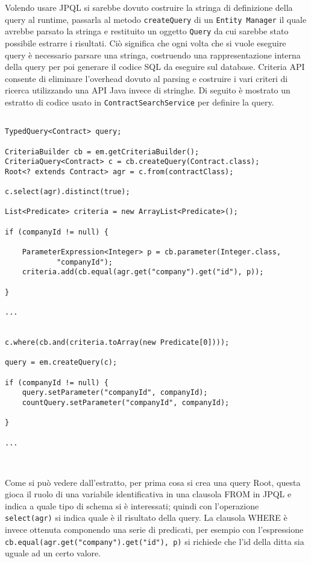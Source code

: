 Volendo usare JPQL si sarebbe dovuto costruire la stringa di definizione della query al runtime, passarla al metodo \lstinline{createQuery} di un
\texttt{Entity Manager} il quale avrebbe parsato la stringa e restituito un oggetto \texttt{Query} da cui sarebbe stato possibile estrarre i risultati.
Ciò significa che ogni volta che si vuole eseguire query è necessario parsare una stringa, costruendo una rappresentazione interna della query per poi generare il codice SQL da
eseguire sul database. Criteria API consente di eliminare l'overhead dovuto al parsing e costruire i vari criteri di ricerca utilizzando una API Java invece
di stringhe. Di seguito è mostrato un estratto di codice usato in \texttt{ContractSearchService} per definire la query.

\begin{lstlisting}

TypedQuery<Contract> query;

CriteriaBuilder cb = em.getCriteriaBuilder();
CriteriaQuery<Contract> c = cb.createQuery(Contract.class);
Root<? extends Contract> agr = c.from(contractClass);

c.select(agr).distinct(true);

List<Predicate> criteria = new ArrayList<Predicate>();

if (companyId != null) {

	ParameterExpression<Integer> p = cb.parameter(Integer.class,
			"companyId");
	criteria.add(cb.equal(agr.get("company").get("id"), p));

}

...


c.where(cb.and(criteria.toArray(new Predicate[0])));
	
query = em.createQuery(c);

if (companyId != null) {
	query.setParameter("companyId", companyId);
	countQuery.setParameter("companyId", companyId);

}

...	

 
\end{lstlisting}

Come si può vedere dall'estratto, per prima cosa si crea una query Root, questa gioca il ruolo di una variabile identificativa in una clausola FROM 
in JPQL e indica a quale tipo di schema si è interessati; quindi con l'operazione \lstinline{select(agr)} si indica quale è il
risultato della query. La clausola WHERE è invece ottenuta componendo una serie di predicati, per esempio con l'espressione
\lstinline{cb.equal(agr.get("company").get("id"), p)} si richiede che l'id della ditta sia uguale ad un certo valore.




